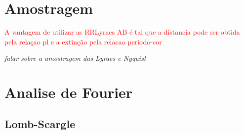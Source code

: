 \begin{comment}
Em 1969 as placas CCD (do inglês, \textit{Charged Coupled Device}) foram criadas no Bell Laboratories nos Estado Unidos. Este dispositivo apresenta alta sensibilidade espectral, podendo ser utilizado em faixas de $350 a 1000 \si{nm}$, habilidade de detectar luz em área quando dispostas em conjunto (chamado de \textit{CCD Array}) e por transformar a observação em sinal digital sendo possível analisar as imagens em computadores, facilitando o trabalho de detecção de periodicidades através dos métodos de detecção de períodos.

As placas CCD são os dispositivos utilizados no grandes projetos de levantamento de dados astronômicos (\textit{Surveys}) atualmente. Um destes projetos é o OGLE que atualmente está atuando em sua quarta fase. A terceira fase \citep{Udalski2008} que já esta completa e possui os dados públicos\footnote{\url{http://ogledb.astrouw.edu.pl/~ogle/CVS/}} e parte desses dados são utilizados neste trabalho, monitorou mais de 200 milhões de estrelas nas Nuvens de Magalhães e se espera detectar em torno de um milhão de estrelas variáveis .

\end{comment}

\section{Amostragem}

\textcolor{red}{A vantagem de utilizar as RRLyraes AB é tal que a distancia pode ser obtida pela relaçao pl e a extinção pela relacao periodo-cor \citep{Pejcha2009}}

\textit{falar sobre a amostragem das Lyraes e Nyquist}

\section{Analise de Fourier}

\subsection{Lomb-Scargle}

